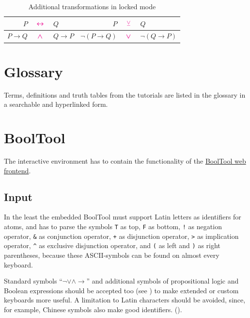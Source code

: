 \begin{table}[htdp]
\begin{center}
\begin{tabular}{rcl|rcl}

$P$&$ \;{\boldsymbol{\color{magenta}\leftrightarrow}}\;$&$Q$					&$P$&$ \;{\boldsymbol{\color{magenta}\veebar}}\;$&$Q$			\\
\hline
$P \rightarrow Q $&$ \;{\boldsymbol{\color{magenta}\wedge}}\;$&$Q \rightarrow P$	&$\neg(P \rightarrow Q) $&$ \;{\boldsymbol{\color{magenta}\vee}}\;$&$\neg (Q \rightarrow P)$				\\

\end{tabular}
\caption{Additional transformations in locked mode}
\label{tab:addnf}
\end{center}
\end{table}%

\section{Glossary}

Terms, definitions and truth tables from the tutorials are listed in the glossary in a searchable and hyperlinked form.

\section{BoolTool}

The interactive environment has to contain the functionality of the
\href{http://cl-informatik.uibk.ac.at/software/booltool/}{BoolTool web frontend}.

\subsection{Input}

In the least the embedded BoolTool must support Latin letters as identifiers for atoms, 
and has to parse the symbols
\verb#T# as top, 
\verb#F# as bottom,
\verb#!# as negation operator, 
\verb#&# as conjunction operator,
\verb#+# as disjunction operator,
\verb#># as implication operator,
\verb#^# as exclusive disjunction operator,
and \verb#(# as left and \verb#)# as right parentheses, 
because these ASCII-symbols can be found on almost every keyboard.

Standard symbols “$ \neg \vee \wedge \rightarrow $” 
and additional symbols of propositional logic and Boolean expressions
should be accepted too (see ) 
to make extended or custom keyboards more useful.
A limitation to Latin characters should be avoided, since, for example, 
Chinese symbols also make good identifiers. ().

